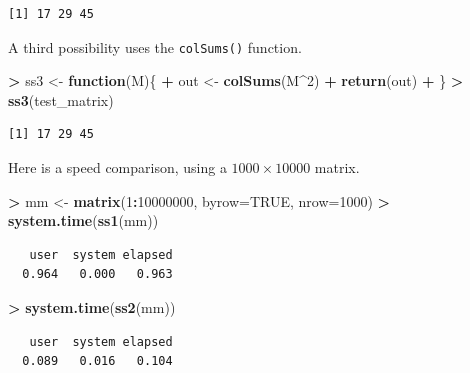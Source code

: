 \documentclass[
]{krantz}
\makeatletter
\newenvironment{Shaded}{\begin{snugshade}}{\end{snugshade}}
\newcommand{\ControlFlowTok}[1]{\textcolor[rgb]{0.27,0.27,0.27}{\textbf{#1}}}
\newcommand{\DataTypeTok}[1]{\textcolor[rgb]{0.27,0.27,0.27}{#1}}
\newcommand{\DecValTok}[1]{\textcolor[rgb]{0.06,0.06,0.06}{#1}}
\newcommand{\KeywordTok}[1]{\textcolor[rgb]{0.27,0.27,0.27}{\textbf{#1}}}
\newcommand{\NormalTok}[1]{#1}
\newcommand{\OperatorTok}[1]{\textcolor[rgb]{0.43,0.43,0.43}{\textbf{#1}}}
\newcommand{\OtherTok}[1]{\textcolor[rgb]{0.37,0.37,0.37}{#1}}
\newcommand{\StringTok}[1]{\textcolor[rgb]{0.5,0.5,0.5}{#1}}
\newenvironment{kframe}{%
\medskip{}
\setlength{\fboxsep}{.8em}
 \def\at@end@of@kframe{}%
 \ifinner\ifhmode%
  \def\at@end@of@kframe{\end{minipage}}%
  \begin{minipage}{\columnwidth}%
 \fi\fi%
 \def\FrameCommand##1{\hskip\@totalleftmargin \hskip-\fboxsep
 \colorbox{shadecolor}{##1}\hskip-\fboxsep
     \hskip-\linewidth \hskip-\@totalleftmargin \hskip\columnwidth}%
 \MakeFramed {\advance\hsize-\width
   \@totalleftmargin\z@ \linewidth\hsize
   \@setminipage}}%
 {\par\unskip\endMakeFramed%
 \at@end@of@kframe}
\renewenvironment{Shaded}{\begin{kframe}}{\end{kframe}}
\makeatother
\begin{document}
\begin{verbatim}
[1] 17 29 45
\end{verbatim}

A third possibility uses the \texttt{colSums()} function.

\begin{Shaded}
\begin{Highlighting}[]
\OperatorTok{\textgreater{}}\StringTok{ }\NormalTok{ss3 \textless{}{-}}\StringTok{ }\ControlFlowTok{function}\NormalTok{(M)\{}
\OperatorTok{+}\StringTok{     }\NormalTok{out \textless{}{-}}\StringTok{ }\KeywordTok{colSums}\NormalTok{(M}\OperatorTok{\^{}}\DecValTok{2}\NormalTok{)}
\OperatorTok{+}\StringTok{     }\KeywordTok{return}\NormalTok{(out)}
\OperatorTok{+}\StringTok{ }\NormalTok{\}}
\OperatorTok{\textgreater{}}\StringTok{ }\KeywordTok{ss3}\NormalTok{(test\_matrix)}
\end{Highlighting}
\end{Shaded}

\begin{verbatim}
[1] 17 29 45
\end{verbatim}

Here is a speed comparison, using a \(1000\times 10000\) matrix.

\begin{Shaded}
\begin{Highlighting}[]
\OperatorTok{\textgreater{}}\StringTok{ }\NormalTok{mm \textless{}{-}}\StringTok{ }\KeywordTok{matrix}\NormalTok{(}\DecValTok{1}\OperatorTok{:}\DecValTok{10000000}\NormalTok{, }\DataTypeTok{byrow=}\OtherTok{TRUE}\NormalTok{, }\DataTypeTok{nrow=}\DecValTok{1000}\NormalTok{)}
\OperatorTok{\textgreater{}}\StringTok{ }\KeywordTok{system.time}\NormalTok{(}\KeywordTok{ss1}\NormalTok{(mm))}
\end{Highlighting}
\end{Shaded}

\begin{verbatim}
   user  system elapsed 
  0.964   0.000   0.963 
\end{verbatim}

\begin{Shaded}
\begin{Highlighting}[]
\OperatorTok{\textgreater{}}\StringTok{ }\KeywordTok{system.time}\NormalTok{(}\KeywordTok{ss2}\NormalTok{(mm))}
\end{Highlighting}
\end{Shaded}

\begin{verbatim}
   user  system elapsed 
  0.089   0.016   0.104 
\end{verbatim}
\end{document}
